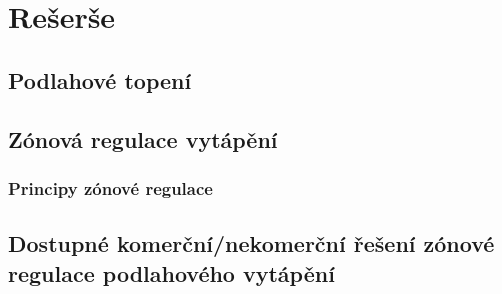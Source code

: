 

\chapter{Rešerše}


\section{Podlahové topení}


\section{Zónová regulace vytápění}

\subsection{Principy zónové regulace}

\section{Dostupné komerční/nekomerční řešení zónové regulace podlahového vytápění}








